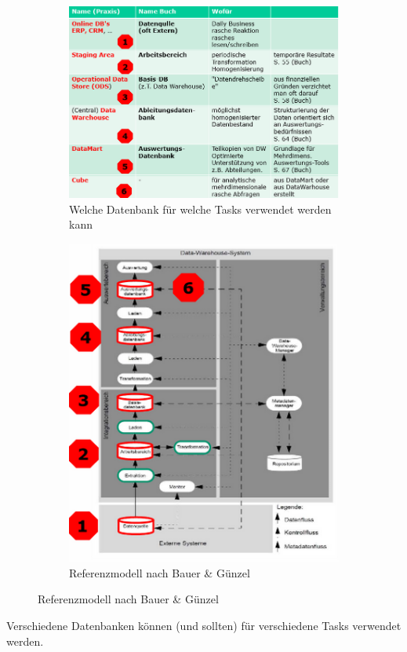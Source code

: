 \documentclass[a4paper, 11pt]{article}
\begin{document}
\begin{figure}[htb]
	\centering
	\begin{subfigure}{0.45\textwidth}
		\centering
		\includegraphics[width=\linewidth]{whichDB.PNG}
		\caption{Welche Datenbank für welche Tasks verwendet werden kann}
		\label{fig:whichDB}
	\end{subfigure}
	\begin{subfigure}{0.45\textwidth}
		\centering
		\includegraphics[width=\linewidth]{referenceArch.PNG}
		\caption{Referenzmodell nach Bauer \& Günzel}
		\label{fig:refArch}
	\end{subfigure}
\end{figure}

Verschiedene Datenbanken können (und sollten) für verschiedene Tasks verwendet werden.
\end{document}
